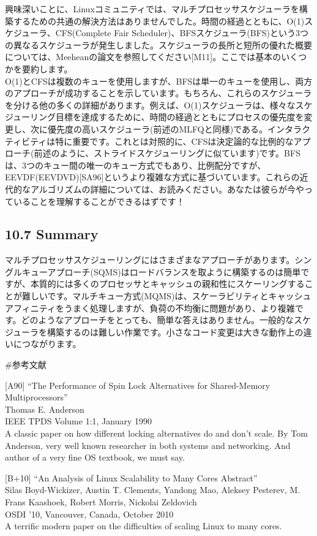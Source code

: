 興味深いことに、Linuxコミュニティでは、マルチプロセッサスケジューラを構築するための共通の解決方法はありませんでした。時間の経過とともに、O(1)スケジューラ、CFS(Complete
Fair
Scheduler)、BFSスケジューラ(BFS)という3つの異なるスケジューラが発生しました。スケジューラの長所と短所の優れた概要については、Meeheanの論文を参照してください{[}M11{]}。ここでは基本のいくつかを要約します。\\
O(1)とCFSは複数のキューを使用しますが、BFSは単一のキューを使用し、両方のアプローチが成功することを示しています。もちろん、これらのスケジューラを分ける他の多くの詳細があります。例えば、O(1)スケジューラは、様々なスケジューリング目標を達成するために、時間の経過とともにプロセスの優先度を変更し、次に優先度の高いスケジューラ(前述のMLFQと同様)である。インタラクティビティは特に重要です。これとは対照的に、CFSは決定論的な比例的なアプローチ(前述のように、ストライドスケジューリングに似ています)です。BFSは、3つのキュー間の唯一のキュー方式でもあり、比例配分ですが、EEVDF(EEVDVD){[}SA96{]}というより複雑な方式に基づいています。これらの近代的なアルゴリズムの詳細については、お読みください。あなたは彼らが今やっていることを理解することができるはずです！

\hypertarget{summary-4}{%
\subsection*{10.7 Summary}\label{summary-4}}

マルチプロセッサスケジューリングにはさまざまなアプローチがあります。シングルキューアプローチ(SQMS)はロードバランスを取ように構築するのは簡単ですが、本質的には多くのプロセッサとキャッシュの親和性にスケーリングすることが難しいです。マルチキュー方式(MQMS)は、スケーラビリティとキャッシュアフィニティをうまく処理しますが、負荷の不均衡に問題があり、より複雑です。どのようなアプローチをとっても、簡単な答えはありません。一般的なスケジューラを構築するのは難しい作業です。小さなコード変更は大きな動作上の違いにつながります。

\#参考文献

{[}A90{]} ``The Performance of Spin Lock Alternatives for Shared-Memory
Multiprocessors''\\
Thomas E. Anderson\\
IEEE TPDS Volume 1:1, January 1990\\
A classic paper on how different locking alternatives do and don't
scale. By Tom Anderson, very well known researcher in both systems and
networking. And author of a very fine OS textbook, we must say.

{[}B+10{]} ``An Analysis of Linux Scalability to Many Cores Abstract''\\
Silas Boyd-Wickizer, Austin T. Clements, Yandong Mao, Aleksey Pesterev,
M. Frans Kaashoek, Robert Morris, Nickolai Zeldovich\\
OSDI '10, Vancouver, Canada, October 2010\\
A terrific modern paper on the difficulties of scaling Linux to many
cores.

